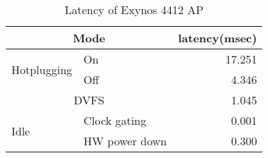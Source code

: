 \begin{table}[tb]
\begin{center}
\begin{footnotesize}
\begin{tabular}{l|l|r}
\hline \hline
\multicolumn{2}{c|}{Mode}	& 	latency(msec)	\\
\hline
\multirow{2}{*}{Hotplugging}	&	On	&	17.251 \\\cline{2-3}
				&	Off	& 4.346 \\
\hline
\multicolumn{2}{c|}{DVFS}	&	1.045	\\
\hline
\multirow{2}{*}{Idle}		&	Clock gating	&	0.001 \\ \cline{2-3}
				&	HW power down	& 	0.300 \\
\hline \hline
\end{tabular}
\end{footnotesize}
\end{center}
\caption{Latency of Exynos 4412 AP}
\end{table}

\begin{comment}
[Clock gating(WFI(Wait For Interrupt))]

WFI and WFE Standby modes disable most of the clocks of a processor, while keeping
its logic powered up. This reduces the power drawn to the static leakage current, leaving
a tiny clock power overhead requirement to enable the device to wake up.
Entry into WFI Standby mode is performed by executing the WFI instruction.


[ARM Power down mode]

Shutdown mode powers down the entire device, and all state, including cache, must be saved
externally by software. This state saving is performed with interrupts disabled, and finishes with
a Data Synchronization Barrier operation. The Cortex-A9 processor then communicates with a
power controller that the device is ready to be powered down in the same manner as when
entering Dormant Mode. The processor is returned to the run state by asserting reset.
\end{comment}
